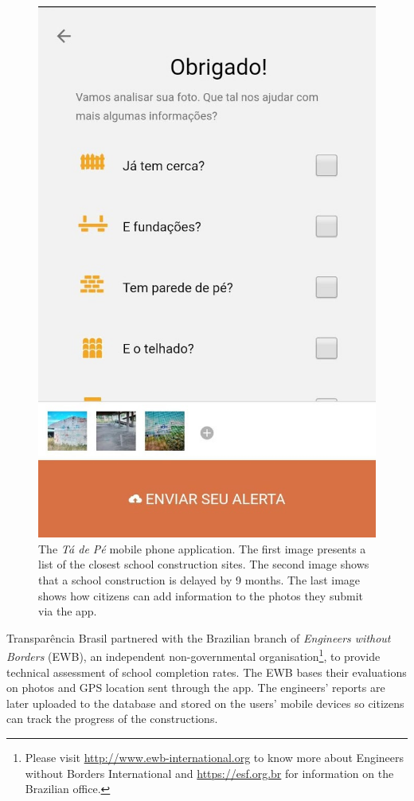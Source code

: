 \documentclass[12pt,a4paper,]{article}
\begin{document}
\begin{figure}
\begin{minipage}[t]{.3\textwidth}
       \includegraphics[scale=0.25]{tdp02.jpg}
     \end{minipage}
\caption{The \textit{Tá de Pé} mobile phone application. The first image presents a list of the closest school construction sites. The second image shows that a school construction is delayed by 9 months. The last image shows how citizens can add information to the photos they submit via the app.} 
\label{fig:screenshots}
\end{figure}

Transparência Brasil partnered with the Brazilian branch of
\emph{Engineers without Borders} (EWB), an independent non-governmental
organisation\footnote{Please visit
  \url{http://www.ewb-international.org} to know more about Engineers
  without Borders International and \url{https://esf.org.br} for
  information on the Brazilian office.}, to provide technical assessment
of school completion rates. The EWB bases their evaluations on photos
and GPS location sent through the app. The engineers' reports are later
uploaded to the database and stored on the users' mobile devices so
citizens can track the progress of the constructions.
\end{document}
